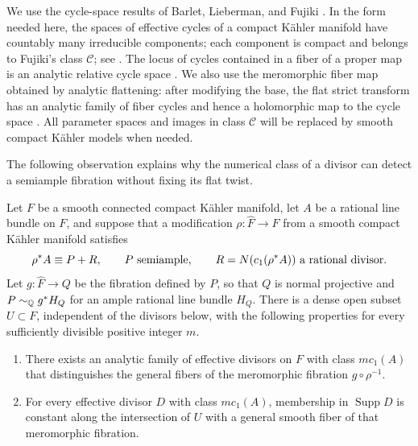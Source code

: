 We use the cycle-space results of Barlet, Lieberman, and Fujiki
\cite{Barlet,LiebermanCycles,Fujiki1978,Fujiki}.  In the form needed here,
the spaces of
effective cycles of a compact K\"ahler manifold have countably many
irreducible components; each component is compact and belongs to
Fujiki's class $\mathcal C$; see \cite[p.~189]{Fujiki}.  The locus of
cycles contained in a fiber of a proper map is an analytic relative
cycle space \cite[Proposition~3.2]{Fujiki1978}.  We also use the
meromorphic fiber map obtained by analytic flattening: after modifying
the base, the flat strict transform has an analytic family of fiber
cycles and hence a holomorphic map to the cycle space
\cite[Chapter~V]{Barlet}.  All parameter spaces and images in class $\mathcal C$
will be replaced by smooth compact K\"ahler models when needed.

The following observation explains why the numerical class of a divisor
can detect a semiample fibration without fixing its flat twist.

\begin{lemma}\label{cycle:divisors}
Let $F$ be a smooth connected compact K\"ahler manifold, let $A$ be a
rational line bundle on $F$, and suppose that a modification
$\rho:\widehat F\to F$ from a smooth compact K\"ahler manifold satisfies
\begin{equation}\label{cycle:fiber-decomposition}
 \rho^*A\equiv P+R,
 \qquad P\text{ semiample},
 \qquad R=N(c_1(\rho^*A))\text{ a rational divisor}.
\end{equation}
Let $g:\widehat F\to Q$ be the fibration defined by $P$, so that $Q$ is
normal projective and $P\sim_{\mathbb Q} g^*H_Q$ for an ample rational line bundle
$H_Q$.  There is a dense open subset $U\subset F$, independent of the
divisors below, with the following properties for every sufficiently
divisible positive integer $m$.
\begin{enumerate}
\item There exists an analytic family of effective
divisors on $F$ with class $m c_1(A)$ that distinguishes the general fibers
of the meromorphic fibration $g\circ\rho^{-1}$.
\item For every effective divisor $D$ with class
$m c_1(A)$, membership
in $\operatorname{Supp}D$ is constant along the intersection of $U$
with a general smooth fiber of that meromorphic fibration.
\end{enumerate}
\end{lemma}

